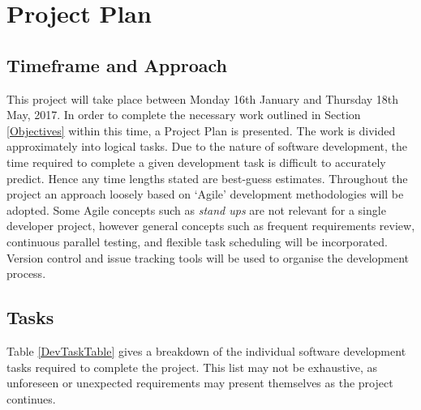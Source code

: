 \documentclass[titlepage,hidelinks,10pt]{article}
\begin{document}
\section{Project Plan}
\subsection{Timeframe and Approach}
This project will take place between Monday 16th January and Thursday 18th May, 2017. In order to complete the necessary work outlined in Section \ref{Objectives} within this time, a Project Plan is presented. The work is divided approximately into logical tasks.  Due to the nature of software development, the time required to complete a given development task is difficult to accurately predict. Hence any time lengths stated are best-guess estimates. Throughout the project an approach loosely based on `Agile' development methodologies will be adopted\cite{Agile}. Some Agile concepts such as \textit{stand ups} are not relevant for a single developer project, however general concepts such as frequent requirements review, continuous parallel testing, and flexible task scheduling will be incorporated. Version control and issue tracking tools will be used to organise the development process.

\subsection{Tasks}\label{Tasks}
Table \ref{DevTaskTable} gives a breakdown of the individual software development tasks required to complete the project. This list may not be exhaustive, as unforeseen or unexpected requirements may present themselves as the project continues.
\end{document}

